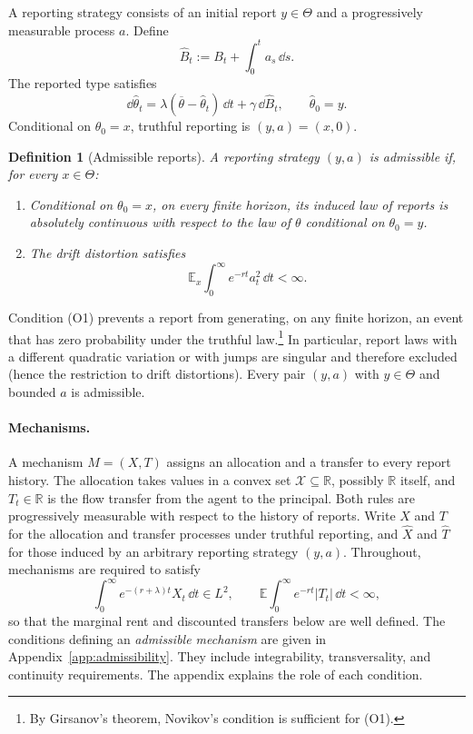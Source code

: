 \documentclass[12pt]{article}
\newtheorem{definition}{Definition}
\newcommand{\E}{\mathbb{E}}
\newcommand{\hth}{\hat\theta}
\newcommand{\hB}{\hat B}
\begin{document}
A reporting strategy consists of an initial report \(y\in\Theta\) and a progressively measurable process \(a\). Define
\[
  \hB_t:=B_t+\int_0^t a_s\,\dd s.
\]
The reported type satisfies
\begin{equation}\label{eq:ou-report}
  \dd\hth_t
  =
  \lambda(\overline\theta-\hth_t)\,\dd t
  +\gamma\,\dd\hB_t,
  \qquad
  \hth_0=y.
\end{equation}
Conditional on \(\theta_0=x\), truthful reporting is \((y,a)=(x,0)\).

\begin{definition}[Admissible reports]\label{def:ou-reports}
A reporting strategy \((y,a)\) is admissible if, for every
\(x\in\Theta\):
\begin{enumerate}[label=\textnormal{(O\arabic*)},leftmargin=2.7em]
  \item Conditional on \(\theta_0=x\), on every finite horizon, its
  induced law of reports is absolutely continuous with respect to the law
  of \(\theta\) conditional on \(\theta_0=y\).

  \item The drift distortion satisfies
  \[
    \E_x\int_0^\infty e^{-rt}a_t^2\,\dd t<\infty.
  \]
\end{enumerate}
\end{definition}

Condition (O1) prevents a report from generating, on any finite
horizon, an event that has zero probability under the truthful law.\footnote{By Girsanov's theorem, Novikov's condition is sufficient for (O1).
}
In particular, report laws with a different quadratic variation or
with jumps are singular and therefore excluded (hence the restriction to drift distortions). 
Every pair \((y,a)\) with \(y\in\Theta\) and bounded \(a\) is
admissible.

\paragraph{Mechanisms.}
A mechanism \(M=(X,T)\) assigns an allocation and a transfer to every
report history. The allocation takes values in a convex set
\(\mathcal X\subseteq\mathbb R\), possibly \(\mathbb R\) itself, and
\(T_t\in  \mathbb{R}\) is the flow transfer from the agent to the principal. Both rules
are progressively measurable with respect to the history of reports.
Write \(X\) and \(T\) for the allocation and transfer processes under
truthful reporting, and \(\widehat X\) and \(\widehat T\) for those
induced by an arbitrary reporting strategy \((y,a)\). Throughout, mechanisms are required to satisfy
\begin{equation}\label{eq:model-integrability}
  \int_0^\infty e^{-(r+\lambda)t}X_t\,\dd t\in L^2,
  \qquad
  \E\int_0^\infty e^{-rt}|T_t|\,\dd t<\infty,
\end{equation}
so that the marginal rent and discounted transfers below are well
defined. The conditions defining an \emph{admissible mechanism} are given in
Appendix~\ref{app:admissibility}. They include integrability,
transversality, and continuity requirements. The appendix explains
the role of each condition.
\end{document}
